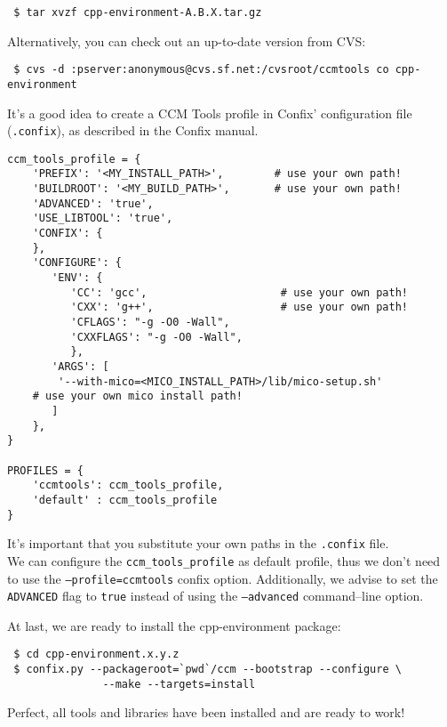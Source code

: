 \begin{small}
\begin{verbatim}
 $ tar xvzf cpp-environment-A.B.X.tar.gz
\end{verbatim}
\end{small}

Alternatively, you can check out an up-to-date version from CVS:
\begin{small}
\begin{verbatim}
 $ cvs -d :pserver:anonymous@cvs.sf.net:/cvsroot/ccmtools co cpp-environment
\end{verbatim}
\end{small}

It's a good idea to create a CCM Tools profile in Confix' configuration file
({\tt .confix}), as described in the Confix manual.
\begin{small}
\begin{verbatim}
ccm_tools_profile = {
    'PREFIX': '<MY_INSTALL_PATH>',        # use your own path!
    'BUILDROOT': '<MY_BUILD_PATH>',       # use your own path!
    'ADVANCED': 'true',
    'USE_LIBTOOL': 'true',
    'CONFIX': {
    },
    'CONFIGURE': {
       'ENV': {
          'CC': 'gcc',                     # use your own path!
          'CXX': 'g++',                    # use your own path!    
          'CFLAGS': "-g -O0 -Wall",
          'CXXFLAGS': "-g -O0 -Wall",
          },
       'ARGS': [
        '--with-mico=<MICO_INSTALL_PATH>/lib/mico-setup.sh'
	# use your own mico install path!
       ]
    },
}

PROFILES = {
    'ccmtools': ccm_tools_profile,
    'default' : ccm_tools_profile
}
\end{verbatim}
\end{small}

\noindent
It's important that you substitute your own paths in the {\tt .confix} file.\\
We can configure the {\tt ccm\_tools\_profile} as default profile, thus we 
don't need to use the {\tt --profile=ccmtools} confix option.
Additionally, we advise to set the {\tt ADVANCED} flag to {\tt true} instead of
using the {\tt --advanced} command--line option. 

At last, we are ready to install the cpp-environment package:
\begin{small}
\begin{verbatim}
 $ cd cpp-environment.x.y.z
 $ confix.py --packageroot=`pwd`/ccm --bootstrap --configure \
               --make --targets=install
\end{verbatim}
\end{small}

Perfect, all tools and libraries have been installed and are ready to work!





